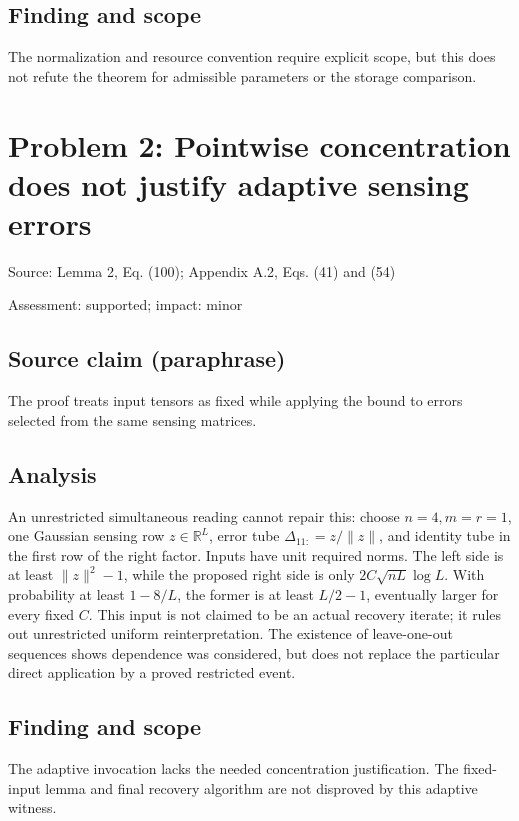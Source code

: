 \documentclass[11pt]{article}
\begin{document}
\subsection*{Finding and scope}

The normalization and resource convention require explicit scope, but this does not refute the theorem for admissible parameters or the storage comparison.

\section*{Problem 2: Pointwise concentration does not justify adaptive sensing errors}

Source: Lemma 2, Eq. (100); Appendix A.2, Eqs. (41) and (54)

Assessment: supported; impact: minor

\subsection*{Source claim (paraphrase)}

The proof treats input tensors as fixed while applying the bound to errors selected from the same sensing matrices.

\subsection*{Analysis}

An unrestricted simultaneous reading cannot repair this: choose \(n=4,m=r=1\), one Gaussian sensing row \(z\in\mathbb R^L\), error tube \(\Delta_{11:}=z/\|z\|\), and identity tube in the first row of the right factor. Inputs have unit required norms. The left side is at least \(\|z\|^2-1\), while the proposed right side is only \(2C\sqrt{nL}\log L\). With probability at least \(1-8/L\), the former is at least \(L/2-1\), eventually larger for every fixed \(C\). This input is not claimed to be an actual recovery iterate; it rules out unrestricted uniform reinterpretation. The existence of leave-one-out sequences shows dependence was considered, but does not replace the particular direct application by a proved restricted event.

\subsection*{Finding and scope}

The adaptive invocation lacks the needed concentration justification. The fixed-input lemma and final recovery algorithm are not disproved by this adaptive witness.
\end{document}

